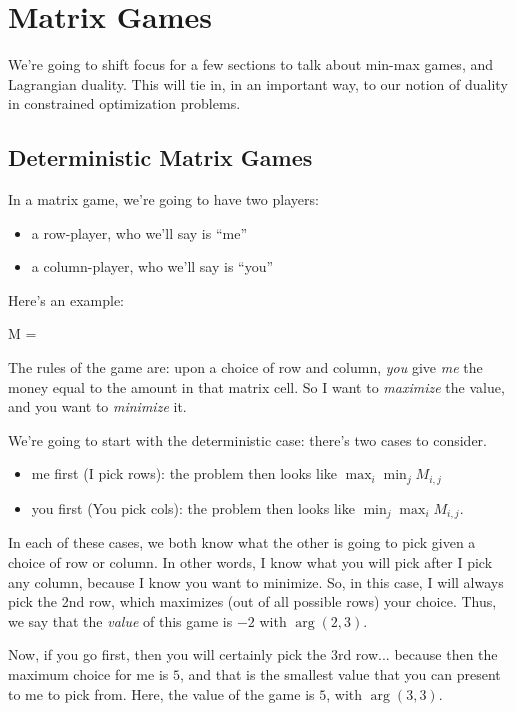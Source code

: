 \pagebreak
\section{Matrix Games}

We're going to shift focus for a few sections to talk about min-max games, and
Lagrangian duality. This will tie in, in an important way, to our notion 
of duality in constrained optimization problems.

\subsection{Deterministic Matrix Games}

In a matrix game, we're going to have two players:
\begin{itemize}
	\item a row-player, who we'll say is ``me''
	\item a column-player, who we'll say is ``you''
\end{itemize}

Here's an example:
\begin{frml}
	M = 
\end{frml}

The rules of the game are: upon a choice of row and column, \textit{you} give 
\textit{me} the money equal to the amount in that matrix cell. So I want to
\textit{maximize} the value, and you want to \textit{minimize} it.

We're going to start with the deterministic case: there's two cases to consider.
\begin{itemize}
	\item me first (I pick rows): the problem then looks like $\max_i \min_j M_{i,j}$
	\item you first (You pick cols): the problem then looks like $\min_j \max_i M_{i,j}$.
\end{itemize}

In each of these cases, we both know what the other is going to pick given a choice of
row or column. In other words, I know what you will pick after I pick any column,
because I know you want to minimize. So, in this case, I will always pick the
2nd row, which maximizes (out of all possible rows) your choice. Thus, we say
that the \textit{value} of this game is $-2$ with $\arg(2,3)$.

Now, if you go first, then you will certainly pick the 3rd row... because then
the maximum choice for me is $5$, and that is the smallest value that you can 
present to me to pick from. Here, the value of the game is $5$, with $\arg(3,3)$.

